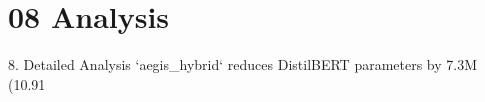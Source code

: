 \section{08 Analysis}

 8. Detailed Analysis
`aegis\_hybrid` reduces DistilBERT parameters by 7.3M (10.91%
